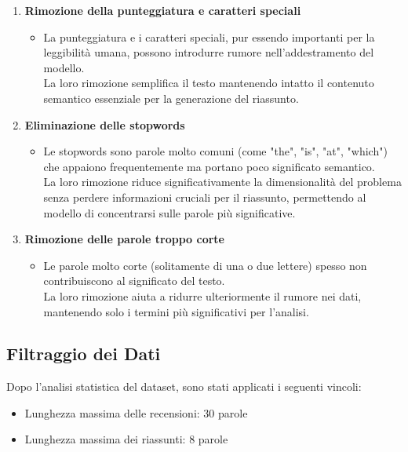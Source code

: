 \begin{enumerate}
    \item \textbf{Rimozione della punteggiatura e caratteri speciali}
    \begin{itemize}
        \item La punteggiatura e i caratteri speciali, pur essendo importanti per la leggibilità umana, possono introdurre rumore nell'addestramento del modello.\\
        La loro rimozione semplifica il testo mantenendo intatto il contenuto semantico essenziale per la generazione del riassunto.
    \end{itemize}

    \item \textbf{Eliminazione delle stopwords}
    \begin{itemize}
        \item Le stopwords sono parole molto comuni (come "the", "is", "at", "which") che appaiono frequentemente ma portano poco significato semantico.\\
        La loro rimozione riduce significativamente la dimensionalità del problema senza perdere informazioni cruciali per il riassunto, permettendo al modello di concentrarsi sulle parole più significative.
    \end{itemize}

    \item \textbf{Rimozione delle parole troppo corte}
    \begin{itemize}
        \item Le parole molto corte (solitamente di una o due lettere) spesso non contribuiscono al significato del testo.\\
        La loro rimozione aiuta a ridurre ulteriormente il rumore nei dati, mantenendo solo i termini più significativi per l'analisi.
    \end{itemize}
\end{enumerate}

\subsection{Filtraggio dei Dati}
Dopo l'analisi statistica del dataset, sono stati applicati i seguenti vincoli:
\begin{itemize}
    \item Lunghezza massima delle recensioni: 30 parole
    \item Lunghezza massima dei riassunti: 8 parole
\end{itemize}

